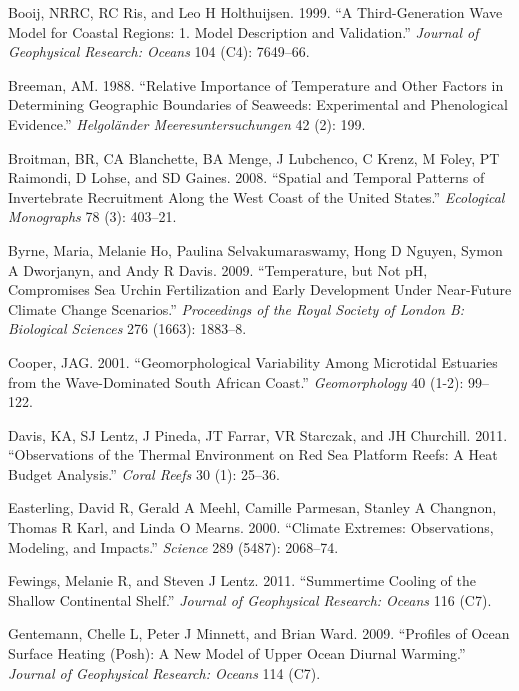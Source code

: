 \documentclass[12pt,a4paper,]{article}
\begin{document}
\leavevmode\hypertarget{ref-Booij1999}{}%
Booij, NRRC, RC Ris, and Leo H Holthuijsen. 1999. ``A Third-Generation
Wave Model for Coastal Regions: 1. Model Description and Validation.''
\emph{Journal of Geophysical Research: Oceans} 104 (C4): 7649--66.

\leavevmode\hypertarget{ref-Breeman1988}{}%
Breeman, AM. 1988. ``Relative Importance of Temperature and Other
Factors in Determining Geographic Boundaries of Seaweeds: Experimental
and Phenological Evidence.'' \emph{Helgoländer Meeresuntersuchungen} 42
(2): 199.

\leavevmode\hypertarget{ref-Broitman2008}{}%
Broitman, BR, CA Blanchette, BA Menge, J Lubchenco, C Krenz, M Foley, PT
Raimondi, D Lohse, and SD Gaines. 2008. ``Spatial and Temporal Patterns
of Invertebrate Recruitment Along the West Coast of the United States.''
\emph{Ecological Monographs} 78 (3): 403--21.

\leavevmode\hypertarget{ref-Byrne2009}{}%
Byrne, Maria, Melanie Ho, Paulina Selvakumaraswamy, Hong D Nguyen, Symon
A Dworjanyn, and Andy R Davis. 2009. ``Temperature, but Not pH,
Compromises Sea Urchin Fertilization and Early Development Under
Near-Future Climate Change Scenarios.'' \emph{Proceedings of the Royal
Society of London B: Biological Sciences} 276 (1663): 1883--8.

\leavevmode\hypertarget{ref-Cooper2001}{}%
Cooper, JAG. 2001. ``Geomorphological Variability Among Microtidal
Estuaries from the Wave-Dominated South African Coast.''
\emph{Geomorphology} 40 (1-2): 99--122.

\leavevmode\hypertarget{ref-Davis2011}{}%
Davis, KA, SJ Lentz, J Pineda, JT Farrar, VR Starczak, and JH Churchill.
2011. ``Observations of the Thermal Environment on Red Sea Platform
Reefs: A Heat Budget Analysis.'' \emph{Coral Reefs} 30 (1): 25--36.

\leavevmode\hypertarget{ref-Easterling2000}{}%
Easterling, David R, Gerald A Meehl, Camille Parmesan, Stanley A
Changnon, Thomas R Karl, and Linda O Mearns. 2000. ``Climate Extremes:
Observations, Modeling, and Impacts.'' \emph{Science} 289 (5487):
2068--74.

\leavevmode\hypertarget{ref-Fewings2011}{}%
Fewings, Melanie R, and Steven J Lentz. 2011. ``Summertime Cooling of
the Shallow Continental Shelf.'' \emph{Journal of Geophysical Research:
Oceans} 116 (C7).

\leavevmode\hypertarget{ref-Gentemann2009}{}%
Gentemann, Chelle L, Peter J Minnett, and Brian Ward. 2009. ``Profiles
of Ocean Surface Heating (Posh): A New Model of Upper Ocean Diurnal
Warming.'' \emph{Journal of Geophysical Research: Oceans} 114 (C7).
\end{document}
